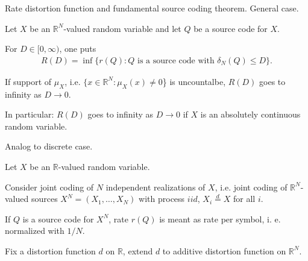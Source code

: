 \begin{frame}{Rate distortion function and fundamental source coding theorem. General case.}  
\bit
\item Let $X$ be an $\mathbb{R}^N$-valued random variable and let $Q$ be a source code for $X$.
\item For $D\in [0,\infty)$, one puts
\begin{align*}
R(D)= \inf\{r(Q)\colon \text{$Q$ is a source code with $\delta_N(Q)\leq D$}\}.
\end{align*}
\item If support of $\mu_X$, i.e. $\{x\in\mathbb{R}^N\colon \mu_X(x)\neq 0$\} is uncountalbe, $R(D)$ goes to infinity as $D\to 0$.
\item In particular: $R(D)$ goes to infinity as $D\to 0$ if $X$ is an absolutely continuous random variable.
\eit

 Analog to discrete case. 
\bit
\item Let $X$ be an $\mathbb{R}$-valued random variable. 
\item Consider joint coding of $N$ independent realizations of $X$, i.e. 
joint coding of $\mathbb{R}^N$-valued sources $X^N=(X_1,\dots,X_N)$ with 
process $iid$, $X_i\stackrel{d}{=}X$ for all $i$.
\item If $Q$ is a source code for $X^N$, rate $r(Q)$ is meant as rate per symbol, i. e. normalized with $1/N$.
\item Fix a distortion function $d$ on $\mathbb{R}$, extend $d$ to additive distortion function on $\mathbb{R}^N$.  
\eit 
\end{frame}

